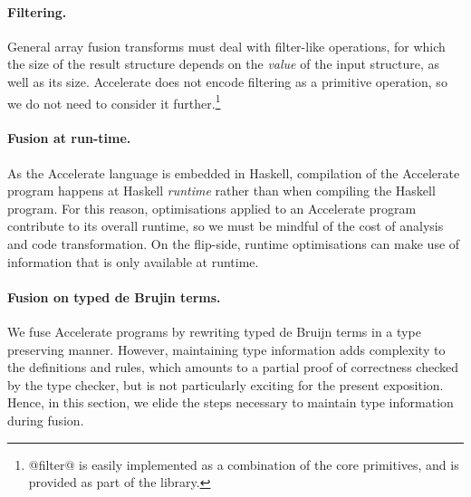 \paragraph{Filtering.} General array fusion transforms must deal with filter-like operations, for which the size of the result structure depends on the \emph{value} of the input structure, as well as its size. Accelerate does not encode filtering as a primitive operation, so we do not need to consider it further.\footnote{@filter@ is easily implemented as a combination of the core primitives, and is provided as part of the library.}

\paragraph{Fusion at run-time.}
As the Accelerate language is embedded in Haskell, compilation of the Accelerate program happens at Haskell \emph{runtime} rather than when compiling the Haskell program. For this reason, optimisations applied to an Accelerate program contribute to its overall runtime, so we must be mindful of the cost of analysis and code transformation. On the flip-side, runtime optimisations can make use of information that is only available at runtime. 

\paragraph{Fusion on typed de Brujin terms.}
We fuse Accelerate programs by rewriting typed de Bruijn terms in a type preserving manner. However, maintaining type information adds complexity to the definitions and rules, which amounts to a partial proof of correctness checked by the type checker, but is not particularly exciting for the present exposition. Hence, in this section, we elide the steps necessary to maintain type information during fusion.

